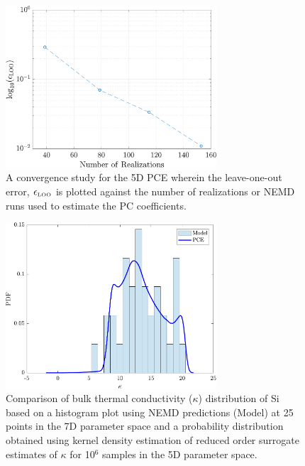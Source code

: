 \clearpage



\begin{figure}[p]
 \begin{center}
  \includegraphics[width=0.70\textwidth]{./Figures/PCE5D_eloo}
\caption{A convergence study for the 5D PCE wherein the leave-one-out
error, $\epsilon_{\tiny{\mbox{LOO}}}$ is plotted against the number of
realizations or NEMD runs used to estimate the PC coefficients.}
\label{fig:loo}
\end{center}
\end{figure}

\clearpage


\begin{figure}[p]
 \begin{center}
  \includegraphics[width=0.70\textwidth]{./Figures/PCE5D_kde}
\caption{Comparison of bulk thermal conductivity ($\kappa$) distribution of Si based on a histogram plot
using NEMD predictions (Model) at 25 points in the 7D parameter space and a probability distribution obtained 
using kernel density estimation of  reduced order surrogate estimates of $\kappa$ for 10$^6$ samples in the 5D
parameter space.}
\label{fig:verify}
\end{center}
\end{figure}

